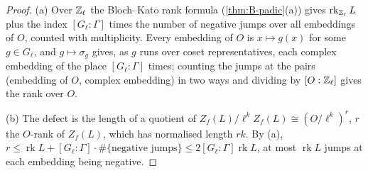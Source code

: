 \begin{proof}
(a) Over $\mathbb{Z}_\ell$ the Bloch--Kato rank formula (\cref{thm:B-padic}(a)) gives $\operatorname{rk}_{\mathbb{Z}_\ell}L$ plus the index $[G_\ell:\Gamma]$ times the number of negative jumps over all embeddings of $O$, counted with multiplicity. Every embedding of $O$ is
$x\mapsto g(x)$ for some $g\in G_\ell$, and $g\mapsto\sigma_g$ gives, as $g$ runs over coset representatives, each complex embedding of the place $[G_\ell:\Gamma]$ times; counting the jumps at the pairs (embedding of $O$, complex embedding) in two ways and
dividing by $[O:\mathbb{Z}_\ell]$ gives the rank over $O$.

(b) The defect is the length of a quotient of $Z_f(L)/\ell^kZ_f(L)\cong(O/\ell^k)^{r}$, $r$ the $O$-rank of $Z_f(L)$, which has normalised length $rk$. By (a), $r\le\operatorname{rk}L+[G_\ell:\Gamma]\cdot\#\{\text{negative jumps}\}\le2[G_\ell:\Gamma]\operatorname{rk}L$, at most $\operatorname{rk}L$
jumps at each embedding being negative.


\end{proof}
